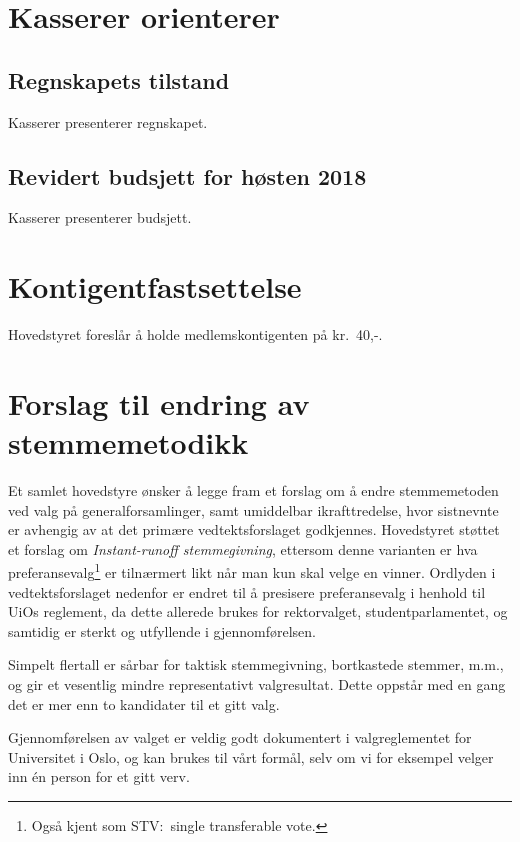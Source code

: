 \documentclass[10pt,norsk,a4paper]{article}
\begin{document}

\section{Kasserer orienterer}
\subsection{Regnskapets tilstand}
Kasserer presenterer regnskapet.


\subsection{Revidert budsjett for høsten 2018}
Kasserer presenterer budsjett.


\section{Kontigentfastsettelse}
Hovedstyret foreslår å holde medlemskontigenten på kr.~40,-.

\section{Forslag til endring av stemmemetodikk}

Et samlet hovedstyre ønsker å legge fram et forslag om å endre stemmemetoden ved valg på generalforsamlinger, samt umiddelbar ikrafttredelse, hvor sistnevnte er avhengig av at det primære vedtektsforslaget godkjennes. Hovedstyret støttet et forslag om \textit{Instant-runoff stemmegivning}, ettersom denne varianten er hva preferansevalg\footnote{Også kjent som STV:\ single transferable vote.} er tilnærmert likt når man kun skal velge en vinner. Ordlyden i vedtektsforslaget nedenfor er endret til å presisere preferansevalg i henhold til UiOs reglement, da dette allerede brukes for rektorvalget, studentparlamentet, og samtidig er sterkt og utfyllende i gjennomførelsen.

\begin{description}[style=nextline]
	\item[Hvorfor bytte vekk fra simpelt flertall?]
		Simpelt flertall er sårbar for taktisk stemmegivning, bortkastede stemmer, m.m., og gir et vesentlig mindre representativt valgresultat. Dette oppstår med en gang det er mer enn to kandidater til et gitt valg.

	\item[Hvordan vil valget utføres med preferansevalg?]
		Gjennomførelsen av valget er veldig godt dokumentert i valgreglementet for Universitet i Oslo, og kan brukes til vårt formål, selv om vi for eksempel velger inn én person for et gitt verv.
		

\end{description}
\end{document}
